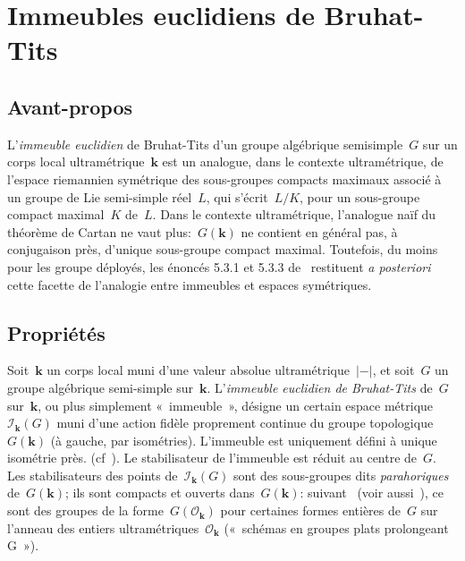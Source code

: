 \documentclass[french]{amsart}
\newcommand{\kk}{\mathbf{k}}
\newcommand{\abs}[1]{{\left|{#1}\right|}}
\newcommand{\Ik}{\mathscr{I}_\kk}
\begin{document}
\section{Immeubles euclidiens de Bruhat-Tits}

\subsection{Avant-propos} L'\emph{immeuble euclidien} de Bruhat-Tits d'un groupe algébrique semisimple~$G$ sur un corps local ultramétrique~$\kk$ est un analogue, dans le contexte ultramétrique, de l'espace riemannien symétrique des sous-groupes compacts maximaux associé à un groupe de Lie semi-simple réel~$L$, qui s'écrit~$L/K$, pour un sous-groupe compact maximal~$K$ de~$L$. Dans le contexte ultramétrique, l'analogue naïf du théorème de Cartan ne vaut plus:~$G(\kk)$ ne contient en général pas, à conjugaison près, d'unique sous-groupe compact maximal. Toutefois, du
moins pour les groupe déployés, les énoncés 5.3.1 et 5.3.3 de~\cite{Ber90} restituent \emph{a
posteriori} cette facette de l'analogie entre immeubles et espaces symétriques.

\subsection{Propriétés}
Soit~$\kk$ un corps local muni d'une valeur absolue ultramétrique~$\abs{-}$, et soit~$G$ un groupe algébrique semi-simple sur~$\kk$. L'\emph{immeuble euclidien de Bruhat-Tits} de~$G$ sur~$\kk$, ou plus simplement «~immeuble~», désigne un certain espace métrique~$\Ik(G)$ muni d'une action fidèle proprement continue du groupe topologique~$G(\kk)$ (à gauche, par isométries). L'immeuble est uniquement défini à unique isométrie près. (cf~\cite[2.1]{Tit79}). Le stabilisateur
de l'immeuble est réduit au centre de~$G$. Les stabilisateurs des points de~$\Ik(G)$ sont des sous-groupes dits \emph{parahoriques} de~$G(\kk)$; 
ils sont compacts et ouverts dans~$G(\kk)$: suivant~\cite[Introduction]{BT84} (voir aussi~\cite[3.4.1]{Tit79}), ce sont des groupes de la forme~$G(\mathscr{O}_\kk)$ pour certaines formes entières de~$G$ sur l'anneau des entiers ultramétriques~$\mathscr{O}_\kk$ («~schémas
en groupes plats prolongeant G~»).
\end{document}
